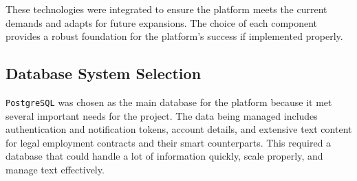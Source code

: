These technologies were integrated to ensure the platform meets the current demands and adapts for future expansions. The choice of each component provides a robust foundation for the platform’s success if implemented properly.

\subsection{Database System Selection}

\texttt{PostgreSQL} was chosen as the main database for the platform because it met several important needs for the project. The data being managed includes authentication and notification tokens, account details, and extensive text content for legal employment contracts and their smart counterparts. This required a database that could handle a lot of information quickly, scale properly, and manage text effectively.

